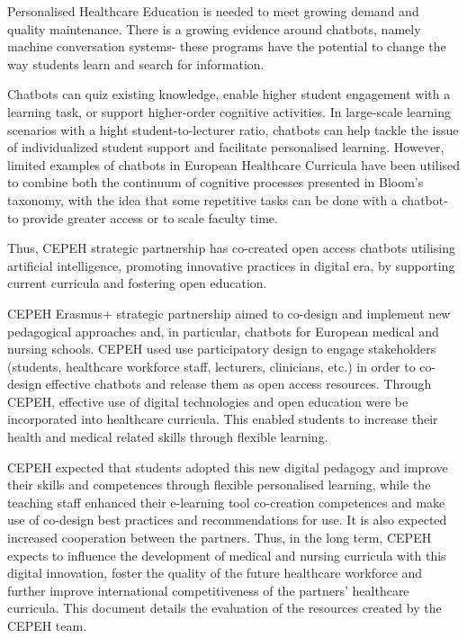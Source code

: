 \documentclass[a4paper, nobind]{templates/ociamthesis}
\begin{document}
\adjustmtc
{}

Personalised Healthcare Education is needed to meet growing demand and quality maintenance.
There is a growing evidence around chatbots, namely machine conversation systems- these programs have the potential to change the way students learn and search for information.

Chatbots can quiz existing knowledge, enable higher student engagement with a learning task, or support higher-order cognitive activities.
In large-scale learning scenarios with a hight student-to-lecturer ratio, chatbots can help tackle the issue of individualized student support and facilitate personalised learning.
However, limited examples of chatbots in European Healthcare Curricula have been utilised to combine both the continuum of cognitive processes presented in Bloom's taxonomy, with the idea that some repetitive tasks can be done with a chatbot- to provide greater access or to scale faculty time.

Thus, CEPEH strategic partnership has co-created open access chatbots utilising artificial intelligence, promoting innovative practices in digital era, by supporting current curricula and fostering open education.

CEPEH Erasmus+ strategic partnership aimed to co-design and implement new pedagogical approaches and, in particular, chatbots for European medical and nursing schools.
CEPEH used use participatory design to engage stakeholders (students, healthcare workforce staff, lecturers, clinicians, etc.) in order to co-design effective chatbots and release them as open access resources.
Through CEPEH, effective use of digital technologies and open education were be incorporated into healthcare curricula.
This enabled students to increase their health and medical related skills through flexible learning.

CEPEH expected that students adopted this new digital pedagogy and improve their skills and competences through flexible personalised learning, while the teaching staff enhanced their e-learning tool co-creation competences and make use of co-design best practices and recommendations for use.
It is also expected increased cooperation between the partners.
Thus, in the long term, CEPEH expects to influence the development of medical and nursing curricula with this digital innovation, foster the quality of the future healthcare workforce and further improve international competitiveness of the partners' healthcare curricula.
This document details the evaluation of the resources created by the CEPEH team.
\end{document}
